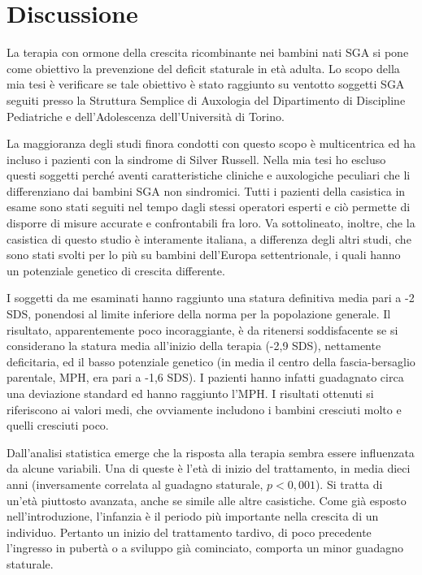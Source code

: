 \chapter{Discussione}

La terapia con ormone della crescita ricombinante nei bambini nati SGA si pone come obiettivo la prevenzione del deficit staturale in età adulta.
Lo scopo della mia tesi è verificare se tale obiettivo è stato raggiunto su ventotto soggetti SGA seguiti presso la Struttura Semplice di Auxologia del Dipartimento di Discipline Pediatriche e dell'Adolescenza dell'Università  di Torino.

La maggioranza  degli studi finora condotti con questo scopo è multicentrica ed ha incluso i pazienti con la  sindrome di Silver Russell. Nella mia tesi ho escluso questi soggetti perché aventi caratteristiche cliniche e auxologiche peculiari che li differenziano dai bambini SGA non sindromici. Tutti i pazienti della casistica in esame sono stati seguiti nel tempo dagli stessi operatori esperti e ciò permette di disporre di misure accurate e confrontabili fra loro. Va sottolineato, inoltre, che la casistica di questo studio è interamente italiana, a differenza degli altri studi, che sono stati svolti per lo più su bambini dell'Europa settentrionale, i quali hanno un potenziale genetico di crescita differente.

I soggetti da me esaminati hanno raggiunto una statura definitiva media pari a -2 SDS, ponendosi al limite inferiore della norma per la popolazione generale. Il risultato, apparentemente poco incoraggiante, è da ritenersi soddisfacente se si considerano la statura  media all'inizio della terapia (-2,9 SDS), nettamente deficitaria, ed il basso potenziale genetico (in media il centro della fascia-bersaglio parentale, MPH, era pari a -1,6 SDS). I pazienti hanno infatti guadagnato circa una deviazione standard ed hanno raggiunto l'MPH. I risultati ottenuti si riferiscono ai valori medi, che ovviamente includono i bambini cresciuti molto e quelli cresciuti poco. 

Dall'analisi statistica emerge che la risposta alla terapia sembra essere influenzata da alcune variabili.
Una di queste è l'età di inizio del trattamento, in media dieci anni (inversamente correlata al guadagno staturale, $p < 0,001$). Si tratta di un'età piuttosto avanzata, anche se simile alle altre casistiche\cite{coutant1998short,zucchini2001final}. Come già esposto nell'introduzione, l'infanzia è il periodo più importante nella crescita di un individuo. Pertanto un inizio del trattamento tardivo, di poco precedente l'ingresso in pubertà o a sviluppo già cominciato, comporta un minor guadagno staturale. 

